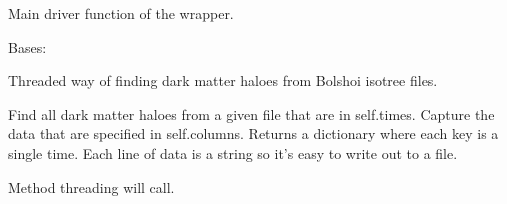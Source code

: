 \documentclass[letterpaper,10pt,english]{sphinxmanual}
\begin{document}

\begin{fulllineitems}
\label{SamPy.bolshoi:SamPy.bolshoi.collecthalomassesThreading.findDMDriver}
Main driver function of the wrapper.

\end{fulllineitems}



\begin{fulllineitems}
\label{SamPy.bolshoi:SamPy.bolshoi.collecthalomassesThreading.findDMhaloes}
Bases: 

Threaded way of finding dark matter haloes from
Bolshoi isotree files.


\begin{fulllineitems}
\label{SamPy.bolshoi:SamPy.bolshoi.collecthalomassesThreading.findDMhaloes.find}
Find all dark matter haloes from a given file
that are in self.times. Capture the data
that are specified in self.columns.
Returns a dictionary where each key is a single
time. Each line of data is a string so it's easy
to write out to a file.

\end{fulllineitems}



\begin{fulllineitems}
\label{SamPy.bolshoi:SamPy.bolshoi.collecthalomassesThreading.findDMhaloes.run}
Method threading will call.

\end{fulllineitems}


\end{fulllineitems}


\end{document}
